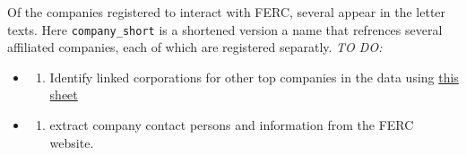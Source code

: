 \documentclass[]{article}
\newenvironment{Shaded}{\begin{snugshade}}{\end{snugshade}}
\newcommand{\KeywordTok}[1]{\textcolor[rgb]{0.13,0.29,0.53}{\textbf{#1}}}
\newcommand{\DataTypeTok}[1]{\textcolor[rgb]{0.13,0.29,0.53}{#1}}
\newcommand{\StringTok}[1]{\textcolor[rgb]{0.31,0.60,0.02}{#1}}
\newcommand{\CommentTok}[1]{\textcolor[rgb]{0.56,0.35,0.01}{\textit{#1}}}
\newcommand{\OperatorTok}[1]{\textcolor[rgb]{0.81,0.36,0.00}{\textbf{#1}}}
\newcommand{\NormalTok}[1]{#1}
\providecommand{\tightlist}{%
  \setlength{\itemsep}{0pt}\setlength{\parskip}{0pt}}
\begin{document}
Of the companies registered to interact with FERC, several appear in the
letter texts. Here \texttt{company\_short} is a shortened version a name
that refrences several affiliated companies, each of which are
registered separatly. \emph{TO DO:}

\begin{itemize}
\item
  \begin{enumerate}
  \def\labelenumi{(\arabic{enumi})}
  \tightlist
  \item
    Identify linked corporations for other top companies in the data
    using
    \href{https://docs.google.com/spreadsheets/d/1FjZIuz8T97nczCbYskjT7-Hl6we6hoa6VndOnFmKDGU/edit\#gid=0}{this
    sheet}
  \end{enumerate}
\item
  \begin{enumerate}
  \def\labelenumi{(\arabic{enumi})}
  \setcounter{enumi}{1}
  \tightlist
  \item
    extract company contact persons and information from the FERC
    website.
  \end{enumerate}
\end{itemize}

\begin{Shaded}
\end{Shaded}
\end{document}
